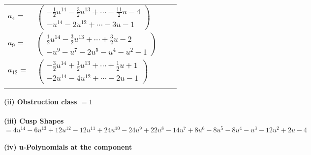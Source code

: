 \documentclass[1p]{elsarticle_modified}
\theoremstyle{definition}
\begin{document}
\begin{tabular}{m{7pt} m{180pt} m{7pt} m{180pt} }
\flushright $a_{4}=$&$\begin{pmatrix}-\frac{1}{2} u^{14}-\frac{3}{2} u^{13}+\cdots-\frac{11}{2} u-4\\- u^{14}-2 u^{12}+\cdots-3 u-1\end{pmatrix}$ \\
\flushright $a_{9}=$&$\begin{pmatrix}\frac{1}{2} u^{14}-\frac{3}{2} u^{13}+\cdots+\frac{3}{2} u-2\\- u^9- u^7-2 u^5- u^4- u^2-1\end{pmatrix}$ \\
\flushright $a_{12}=$&$\begin{pmatrix}-\frac{3}{2} u^{14}+\frac{1}{2} u^{13}+\cdots+\frac{1}{2} u+1\\-2 u^{14}-4 u^{12}+\cdots-2 u-1\end{pmatrix}$\\&\end{tabular}
\flushleft \textbf{(ii) Obstruction class $= 1$}\\~\\
\flushleft \textbf{(iii) Cusp Shapes $= 4 u^{14}-6 u^{13}+12 u^{12}-12 u^{11}+24 u^{10}-24 u^9+22 u^8-14 u^7+8 u^6-8 u^5-8 u^4- u^3-12 u^2+2 u-4$}\\~\\
\newpage\renewcommand{\arraystretch}{1}
\flushleft \textbf{(iv) u-Polynomials at the component}\newline \\
\end{document}
